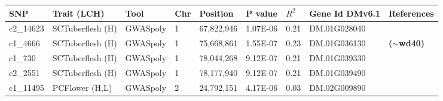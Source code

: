\documentclass[pdflatex,sn-mathphys-ay]{sn-jnl}%
\begin{document}
\begin{landscape}
\begin{table}[ht]
\begin{tabular}{lllllllll}
\hline 
SNP                              & Trait (LCH)                             & Tool                            & Chr               & Position                          & P value                         & $R^2$                          & Gene Id  DMv6.1                              & References                                                                   \\
\hline
\hline
\rowcolor[HTML]{FFFFD7} 
c2\_14623 &SCTuberflesh (H) &GWASpoly &1 &67,822,946 &1.07E-06 &0.21 &DM.01G028040 &\citep{sharma2024genotyping}\\
\cellcolor[HTML]{FFFFD7}c1\_4666                         & \cellcolor[HTML]{FFFFD7}SCTuberflesh (H)                        & \cellcolor[HTML]{FFFFD7} GWASpoly & \cellcolor[HTML]{FFFFD7}1                        & \cellcolor[HTML]{FFFFD7}75,668,861                        & \cellcolor[HTML]{FFFFD7}1.55E-07                        & \cellcolor[HTML]{FFFFD7}0.23                        & \cellcolor[HTML]{FFFFD7}DM.01G036130                        & \cellcolor[HTML]{FFFFD7}\textbf{($\sim$wd40)} \citep{liu2020wd40,sajeevan2023comprehensive}                            \\
\rowcolor[HTML]{FFFFD7} 
c1\_730                          & SCTuberflesh (H)                        & GWASpoly                        & 1                        & 78,044,268                        & 9.12E-07                        & 0.21                        & DM.01G039330                        & \citep{sharma2024genotyping}                                                        \\
\rowcolor[HTML]{FFFFD7} 
c2\_2551                         & SCTuberflesh (H)                        & GWASpoly                        & 1                        & 78,177,940                        & 9.12E-07                        & 0.21                        & DM.01G039490                        & \citep{sharma2024genotyping}                                                        \\
\rowcolor[HTML]{FFFFD7} 
c1\_11495                        & PCFlower (H,L)                          & GWASpoly                        & 2                        & 24,792,151                        & 4.17E-06                        & 0.03                        & DM.02G009890                        & \citep{sharma2024genotyping,Berdugo2017}\\

\end{tabular}
\end{table}
\end{landscape}
\end{document}
